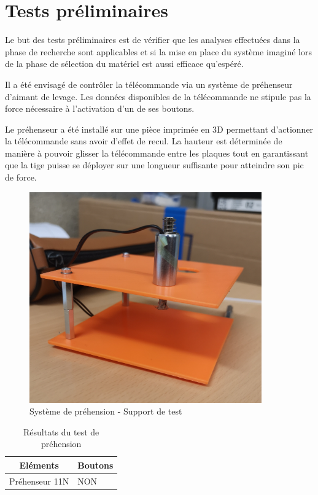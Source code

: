 \section{Tests préliminaires \label{aimant}}
Le but des tests préliminaires est de vérifier que les analyses effectuées dans la phase de recherche sont applicables et si la mise en
place du système imaginé lors de la phase de sélection du matériel est aussi efficace qu'espéré.

Il a été envisagé de contrôler la télécommande via un système de préhenseur d'aimant de levage. Les données disponibles de la télécommande
ne stipule pas la force nécessaire à l'activation d'un de ses boutons.

Le préhenseur a été installé sur une pièce imprimée en 3D permettant d'actionner la télécommande sans avoir d'effet de recul.
La hauteur est déterminée de manière à pouvoir glisser la télécommande entre les plaques tout en garantissant que la tige puisse se déployer sur
une longueur suffisante pour atteindre son pic de force.

\begin{figure}[H]
    \centering
    \includegraphics[width=10cm]{assets/figures/support_test_prehenseur.jpg}
    \caption{Système de préhension - Support de test}
\end{figure}

\begin{table}[h]
    \begin{center}
        \caption{Résultats du test de préhension}
        \begin{tabular}{|c|l|}
            Eléments       & Boutons \\ \hline
            Préhenseur 11N & NON     \\
        \end{tabular}
    \end{center}
\end{table}

